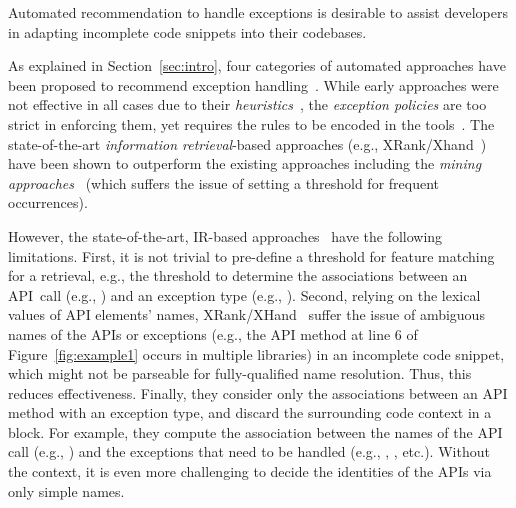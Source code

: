 \begin{Observation} 
\label{ob1}
Automated recommendation to handle exceptions is desirable to
assist developers in adapting incomplete code snippets into their
codebases.
\end{Observation}


As explained in Section~\ref{sec:intro},  four
categories of automated approaches have been proposed to recommend
exception
handling~\cite{xrank-fse20,barbosa-bsse12,chanchal-scam14,barbosa-tse18,barbosa-tse16}. While
early approaches were not effective in all cases due to their {\em
  heuristics}~\cite{barbosa-bsse12}, the {\em exception policies} are
too strict in enforcing them, yet requires the rules to be encoded in
the tools~\cite{barbosa-tse16,barbosa-saner18}. The state-of-the-art
{\em information retrieval}-based approaches (e.g.,
XRank/Xhand~\cite{xrank-fse20}) have been shown to outperform the
existing approaches including the {\em mining
  approaches}~\cite{chanchal-scam14} (which suffers the issue of setting a
threshold for frequent occurrences).


However, the state-of-the-art, IR-based approaches~\cite{xrank-fse20}
have the following limitations. First, it is not trivial to
pre-define a threshold for feature matching for a retrieval, e.g., the
threshold to determine the associations between an API~call (e.g.,
) and an exception type (e.g.,
). Second, relying on the lexical
values of API elements' names, XRank/XHand~\cite{xrank-fse20} suffer
the issue of ambiguous names of the APIs or exceptions (e.g., the API
method  at line 6 of Figure~\ref{fig:example1} occurs in
multiple libraries) in an incomplete code snippet, which might not be
parseable for fully-qualified name resolution. Thus, this reduces 
effectiveness. Finally,
they consider only the associations between an API method with an
exception type, and discard the surrounding code context in a
 block.  For example, they compute the association
between the names of the API call (e.g., )
and the exceptions that need to be handled (e.g.,
, ,
etc.). Without the context, it is even more challenging to decide the
identities of the APIs via only simple names.


